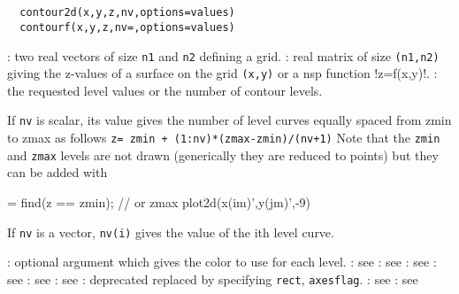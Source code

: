 \begin{mandesc}
  \\
  \\
\end{mandesc}
\begin{calling_sequence}
\begin{verbatim}
  contour2d(x,y,z,nv,options=values)
  contourf(x,y,z,nv=,options=values)
\end{verbatim}
\end{calling_sequence}

\begin{parameters}
  \begin{varlist}
    : two real vectors of size \verb!n1! and \verb!n2! defining a grid.
    : real matrix of size \verb!(n1,n2)! giving the z-values of a surface on the grid
    \verb!(x,y)! or a nsp function !z=f(x,y)!.
    : the requested level values or the number of contour levels.
    \begin{varlist}
      \vname{-}If \verb!nv! is scalar, its value gives the
      number of level curves equally spaced from zmin to zmax as
      follows \verb!z= zmin + (1:nv)*(zmax-zmin)/(nv+1)!
      Note that the \verb!zmin! and \verb!zmax!
      levels are not drawn (generically they are reduced to points)
      but they can be added with
      \begin{nspcode}
        [im,jm] = find(z == zmin); // or zmax
        plot2d(x(im)',y(jm)',-9)
      \end{nspcode}
      \vname{-}If \verb!nv! is a vector, \verb!nv(i)! gives
      the value of the ith level curve.
    \end{varlist}
    : optional argument which gives the color to use for each level.
    : see 
    : see 
    : see 
    : see 
    : see 
    : see 
    : deprecated replaced by specifying \verb!rect!, \verb!axesflag!.
    : see 
    : see 
  \end{varlist}
\end{parameters}

